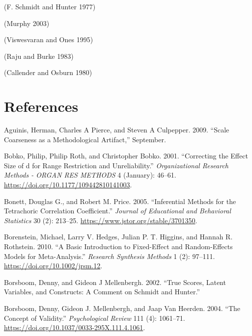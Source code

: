 \documentclass[
  letterpaper,
  DIV=11,
  numbers=noendperiod]{scrreprt}
\newlength{\cslhangindent}
\newlength{\cslentryspacingunit} %
\newenvironment{CSLReferences}[2] %
 {%
  \setlength{\parindent}{0pt}
  \ifodd #1
  \let\oldpar\par
  \def\par{\hangindent=\cslhangindent\oldpar}
  \fi
  \setlength{\parskip}{#2\cslentryspacingunit}
 }%
 {}
\begin{document}
(F. Schmidt and Hunter 1977)

(Murphy 2003)

(Viswesvaran and Ones 1995)

(Raju and Burke 1983)

(Callender and Osburn 1980)


\hypertarget{references-1}{%
\chapter*{References}\label{references-1}}


\hypertarget{refs}{}
\begin{CSLReferences}{1}{0}
\leavevmode{}%
Aguinis, Herman, Charles A Pierce, and Steven A Culpepper. 2009.
{``Scale Coarseness as a Methodological Artifact,''} September.

\leavevmode{}%
Bobko, Philip, Philip Roth, and Christopher Bobko. 2001. {``Correcting
the Effect Size of d for Range Restriction and Unreliability.''}
\emph{Organizational Research Methods - ORGAN RES METHODS} 4 (January):
46--61. \url{https://doi.org/10.1177/109442810141003}.

\leavevmode{}%
Bonett, Douglas G., and Robert M. Price. 2005. {``Inferential Methods
for the Tetrachoric Correlation Coefficient.''} \emph{Journal of
Educational and Behavioral Statistics} 30 (2): 213--25.
\url{https://www.jstor.org/stable/3701350}.

\leavevmode{}%
Borenstein, Michael, Larry V. Hedges, Julian P. T. Higgins, and Hannah
R. Rothstein. 2010. {``A Basic Introduction to Fixed-Effect and
Random-Effects Models for Meta-Analysis.''} \emph{Research Synthesis
Methods} 1 (2): 97--111. \url{https://doi.org/10.1002/jrsm.12}.

\leavevmode{}%
Borsboom, Denny, and Gideon J Mellenbergh. 2002. {``True Scores, Latent
Variables, and Constructs: A Comment on Schmidt and Hunter.''}

\leavevmode{}%
Borsboom, Denny, Gideon J. Mellenbergh, and Jaap Van Heerden. 2004.
{``The Concept of Validity.''} \emph{Psychological Review} 111 (4):
1061--71. \url{https://doi.org/10.1037/0033-295X.111.4.1061}.


\end{CSLReferences}
\end{document}
